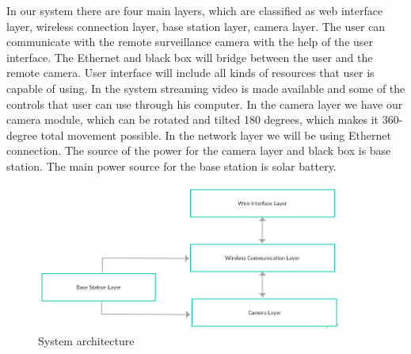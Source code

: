 In our system there are four main layers, which are classified as web interface layer, wireless connection layer, base station layer, camera layer. The user can communicate with the remote surveillance camera with the help of the user interface. The Ethernet and black box will bridge between the user and the remote camera. User interface will include all kinds of resources that user is capable of using. In the system streaming video is made available and some of the controls that user can use through his computer. In the camera layer we have our camera module, which can be rotated and tilted 180 degrees, which makes it 360- degree total movement possible. In the network layer we will be using Ethernet connection. The source of the power for the camera layer and black box is base station. The main power source for the base station is solar battery.



\begin{figure}[h!]
	\centering
 	\includegraphics[width=0.90\textwidth]{images/ADSdiagrams/layers.png}
 \caption{System architecture}
\end{figure}
